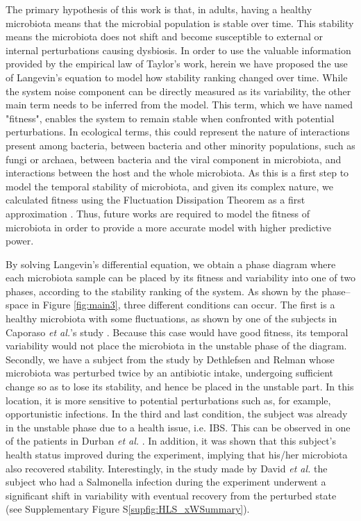 The primary hypothesis of this work is that, in adults, having a healthy microbiota means that the microbial population is stable over time.  This stability means the microbiota does not shift and become susceptible to external or internal perturbations causing dysbiosis. In order to use the valuable information provided by the empirical law of Taylor’s work, herein we have proposed the use of Langevin’s equation to model how stability ranking changed  over time. While the system noise component can be directly measured as its variability, the other main term needs to be inferred from the model. This term, which we have named "fitness", enables the system to remain stable when confronted with potential perturbations. In ecological terms, this could represent the nature of interactions present among bacteria, between bacteria and other minority populations, such as fungi or archaea, between bacteria and the viral component in microbiota, and interactions between the host and the whole microbiota. As this is a first step to model the temporal stability of microbiota, and given its complex nature, we calculated fitness using the Fluctuation Dissipation Theorem as a first approximation \cite{FD}. Thus, future works are required to model the fitness of microbiota in order to provide a more accurate model with higher predictive power. 

By solving Langevin’s differential equation, we obtain a phase diagram where each microbiota sample can be placed by its fitness and variability into one of two phases, according to the stability ranking of the system. As shown by the phase--space in Figure \ref{fig:main3}, three different conditions can occur. The first is a healthy microbiota with some fluctuations, as shown by one of the subjects in Caporaso \emph{et al.}'s study \cite{moving}. Because this case would have good fitness, its temporal variability would not place the microbiota in the unstable phase of the diagram. Secondly, we have a subject from the study by Dethlefsen and Relman \cite{antibiotic} whose microbiota was perturbed twice by an antibiotic intake, undergoing sufficient change so as to lose its stability, and hence be placed in the unstable part. In this location, it is more sensitive to potential perturbations such as, for example, opportunistic infections. In the third and last condition, the subject was already in the unstable phase due to a health issue, i.e. IBS. This can be observed in one of the patients in Durban \emph{et al.} \cite{IBS}. In addition, it was shown that this subject’s health status improved during the experiment, implying that his/her microbiota also recovered stability. Interestingly, in the study made by David \emph{et al.} \cite{hostlife} the subject who had a Salmonella infection during the experiment underwent a significant shift in variability with eventual recovery from the perturbed state (see Supplementary Figure S\ref{supfig:HLS_xWSummary}).

